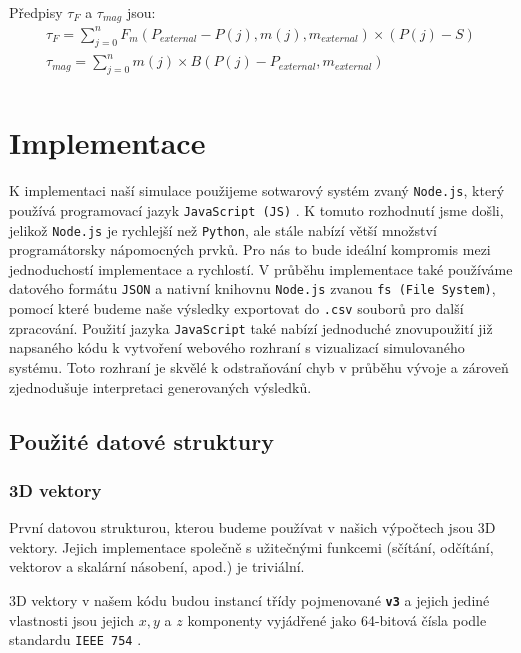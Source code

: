 Předpisy $\tau_F$ a $\tau_{mag}$ jsou:
\begin{equation}
    \label{eq:sim_equations2}
    \begin{gathered}
        \tau_F = \sum_{j=0}^{n} F_m(P_{external}- P(j), m(j), m_{external}) \times (P(j) - S)\\
        \tau_{mag} = \sum_{j=0}^{n} m(j) \times B(P(j)-P_{external},m_{external})\\
    \end{gathered}
\end{equation}

\section{Implementace}
K implementaci naší simulace použijeme sotwarový systém zvaný \texttt{Node.js}, který používá programovací jazyk \texttt{JavaScript (JS)} \cite{JS}. K tomuto rozhodnutí jsme došli, jelikož \texttt{Node.js} je rychlejší než \texttt{Python}, ale stále nabízí větší množství programátorsky nápomocných prvků. Pro nás to bude ideální kompromis mezi jednoduchostí implementace a rychlostí. V průběhu implementace také používáme datového formátu \texttt{JSON} \cite{JSON} a nativní knihovnu \texttt{Node.js} zvanou \texttt{fs (File System)}, pomocí které budeme naše výsledky exportovat do \texttt{.csv} souborů pro další zpracování. Použití jazyka \texttt{JavaScript} také nabízí jednoduché znovupoužití již napsaného kódu k vytvoření webového rozhraní s vizualizací simulovaného systému. Toto rozhraní je skvělé k odstraňování chyb v průběhu vývoje a zároveň zjednodušuje interpretaci generovaných výsledků.

\subsection{Použité datové struktury}

\subsubsection{3D vektory}

První datovou strukturou, kterou budeme používat v našich výpočtech jsou 3D vektory. Jejich implementace společně s užitečnými funkcemi (sčítání, odčítání, vektorov a skalární násobení, apod.) je triviální.

3D vektory v našem kódu budou instancí třídy pojmenované \textbf{\texttt{v3}} a jejich jediné vlastnosti jsou jejich $x,y$ a $z$ komponenty vyjádřené jako 64-bitová čísla podle standardu \texttt{IEEE 754} \cite{IEEE-754}.

